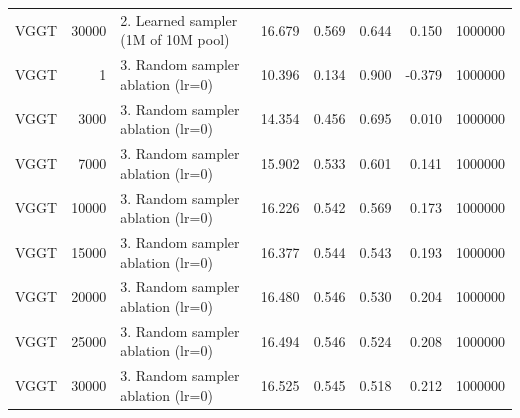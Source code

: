 \begin{table}[H]
\begin{tabular}{lrlrrrrr}
VGGT & 30000 & 2. Learned sampler (1M of 10M pool) & 16.679 & 0.569 & 0.644 & 0.150 & 1000000 \\
VGGT & 1 & 3. Random sampler ablation (lr=0) & 10.396 & 0.134 & 0.900 & -0.379 & 1000000 \\
VGGT & 3000 & 3. Random sampler ablation (lr=0) & 14.354 & 0.456 & 0.695 & 0.010 & 1000000 \\
VGGT & 7000 & 3. Random sampler ablation (lr=0) & 15.902 & 0.533 & 0.601 & 0.141 & 1000000 \\
VGGT & 10000 & 3. Random sampler ablation (lr=0) & 16.226 & 0.542 & 0.569 & 0.173 & 1000000 \\
VGGT & 15000 & 3. Random sampler ablation (lr=0) & 16.377 & 0.544 & 0.543 & 0.193 & 1000000 \\
VGGT & 20000 & 3. Random sampler ablation (lr=0) & 16.480 & 0.546 & 0.530 & 0.204 & 1000000 \\
VGGT & 25000 & 3. Random sampler ablation (lr=0) & 16.494 & 0.546 & 0.524 & 0.208 & 1000000 \\
VGGT & 30000 & 3. Random sampler ablation (lr=0) & 16.525 & 0.545 & 0.518 & 0.212 & 1000000 \\
\bottomrule
\end{tabular}
\end{table}